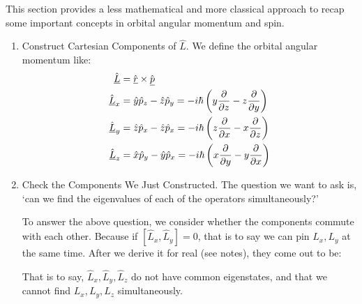 \documentclass{school-22.101-notes}
\begin{document}
This section provides a less mathematical and more classical approach to recap some important concepts in orbital angular momentum and spin. 
\begin{enumerate}
\item Construct Cartesian Components of $\hat{L}$. 
We define the orbital angular momentum like:
\begin{align}
\hat{\underline{L}} &= \hat{\underline{r}} \times \hat{\underline{p}} \\
\hat{\underline{L}}_x &= \hat{y} \hat{p}_z - \hat{z} \hat{p}_y = - i\hbar \left( y \frac{\partial}{\partial z} - z \frac{\partial}{\partial y} \right) \\
\hat{\underline{L}}_y &= \hat{z} \hat{p}_x - \hat{z} \hat{p}_x = - i\hbar \left( z \frac{\partial}{\partial x} - x \frac{\partial}{\partial z} \right) \\
\hat{\underline{L}}_z &= \hat{x} \hat{p}_y - \hat{y} \hat{p}_x = - i\hbar \left( x \frac{\partial}{\partial y} - y \frac{\partial}{\partial x} \right) 
\end{align}

\item Check the Components We Just Constructed. 
The question we want to ask is, `can we find the eigenvalues of each of the operators simultaneously?'

To answer the above question, we consider whether the components commute with each other. Because if $\left[ \hat{L}_x, \hat{L}_y \right] = 0$, that is to say we can pin $L_x, L_y$ at the same time. After we derive it for real (see notes), they come out to be:

That is to say, $\hat{L}_x, \hat{L}_y, \hat{L}_z$ do not have common eigenstates, and that we cannot find $L_x, L_y, L_z$ simultaneously. 


\end{enumerate}
\end{document}
